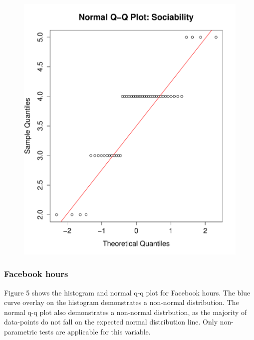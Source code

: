 \begin{figure}[H]
\includegraphics[scale=0.35]{./img/qqplot_sociability.pdf}
\end{figure}

\subsubsection{Facebook hours}

Figure 5 shows the histogram and normal q-q plot for Facebook hours. The blue curve overlay on the histogram demonstrates a non-normal distribution. The normal q-q plot also demonstrates a non-normal distrbution, as the majority of data-points do not fall on the expected normal distribution line. Only non-parametric tests are applicable for this variable.

